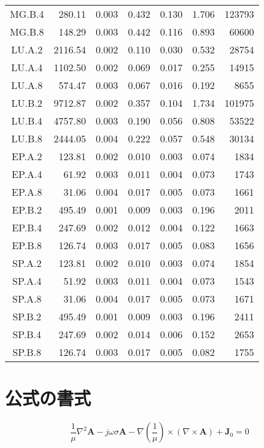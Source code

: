 \begin{ThreePartTable}
\begin{longtable}[c]{c*{6}{r}}
    MG.B.4 & 280.11 & 0.003 & 0.432 & 0.130 & 1.706 & 123793 \\
    MG.B.8 & 148.29 & 0.003 & 0.442 & 0.116 & 0.893 & 60600 \\
    LU.A.2 & 2116.54 & 0.002 & 0.110 & 0.030 & 0.532 & 28754 \\
    LU.A.4 & 1102.50 & 0.002 & 0.069 & 0.017 & 0.255 & 14915 \\
    LU.A.8 & 574.47 & 0.003 & 0.067 & 0.016 & 0.192 & 8655 \\
    LU.B.2 & 9712.87 & 0.002 & 0.357 & 0.104 & 1.734 & 101975 \\
    LU.B.4 & 4757.80 & 0.003 & 0.190 & 0.056 & 0.808 & 53522 \\
    LU.B.8 & 2444.05 & 0.004 & 0.222 & 0.057 & 0.548 & 30134 \\
    EP.A.2 & 123.81 & 0.002 & 0.010 & 0.003 & 0.074 & 1834 \\
    EP.A.4 & 61.92 & 0.003 & 0.011 & 0.004 & 0.073 & 1743 \\
    EP.A.8 & 31.06 & 0.004 & 0.017 & 0.005 & 0.073 & 1661 \\
    EP.B.2 & 495.49 & 0.001 & 0.009 & 0.003 & 0.196 & 2011 \\
    EP.B.4 & 247.69 & 0.002 & 0.012 & 0.004 & 0.122 & 1663 \\
    EP.B.8 & 126.74 & 0.003 & 0.017 & 0.005 & 0.083 & 1656 \\
    SP.A.2 & 123.81 & 0.002 & 0.010 & 0.003 & 0.074 & 1854 \\
    SP.A.4 & 51.92 & 0.003 & 0.011 & 0.004 & 0.073 & 1543 \\
    SP.A.8 & 31.06 & 0.004 & 0.017 & 0.005 & 0.073 & 1671 \\
    SP.B.2 & 495.49 & 0.001 & 0.009 & 0.003 & 0.196 & 2411 \\
    SP.B.4 \tnote{a} & 247.69 & 0.002 & 0.014 & 0.006 & 0.152 & 2653 \\
    SP.B.8 \tnote{b} & 126.74 & 0.003 & 0.017 & 0.005 & 0.082 & 1755 \\
    \bottomrule
  \end{longtable}
\end{ThreePartTable}

\section{公式の書式}

\begin{equation}\label{eq:example}
  \frac{1}{\mu}\nabla^2\mathbf{A}-j\omega\sigma\mathbf{A}
  -\nabla\left(\frac{1}{\mu}\right)\times(\nabla\times\mathbf{A})
  +\mathbf{J}_0=0
\end{equation}

